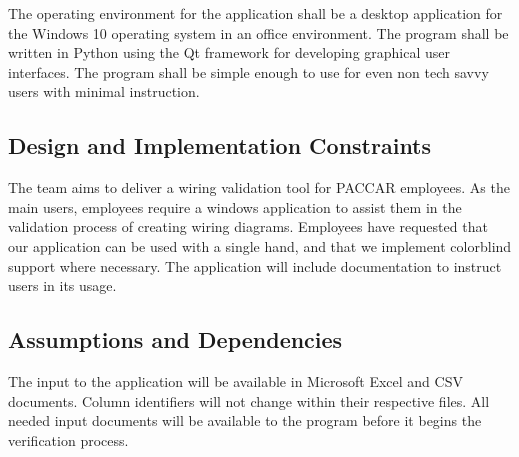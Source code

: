 The operating environment for the application shall be a desktop application for the Windows 10 operating system in an office environment. The program shall be written in Python using the Qt framework for developing graphical user interfaces. The program shall be simple enough to use for even non tech savvy users with minimal instruction.

\subsection{Design and Implementation Constraints}
The team aims to deliver a wiring validation tool for PACCAR employees. As the main users, employees require a windows application to assist them in the validation process of creating wiring diagrams. Employees have requested that our application can be used with a single hand, and that we implement colorblind support where necessary. The application will include documentation to instruct users in its usage. 

\subsection{Assumptions and Dependencies}
The input to the application will be available in Microsoft Excel and CSV documents. Column identifiers will not change within their respective files. All needed input documents will be available to the program before it begins the verification process. 
